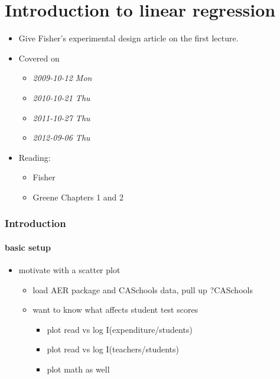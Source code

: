
\part*{Introduction to linear regression}%

\begin{itemize}
\item Give Fisher's experimental design article on the first lecture.
\item Covered on
\begin{itemize}
\item \textit{2009-10-12 Mon}
\item \textit{2010-10-21 Thu}
\item \textit{2011-10-27 Thu}
\item \textit{2012-09-06 Thu}
\end{itemize}
\item Reading:
\begin{itemize}
\item Fisher
\item Greene Chapters 1 and 2
\end{itemize}
\end{itemize}
\section{Introduction}
\label{sec-1}
\subsection{basic setup}
\label{sec-1-1}

\begin{itemize}
\item motivate with a scatter plot
\begin{itemize}
\item load AER package and CASchools data, pull up ?CASchools
\item want to know what affects student test scores
\begin{itemize}
\item plot read vs log I(expenditure/students)
\item plot read vs log I(teachers/students)
\item plot math as well
\end{itemize}
\end{itemize}
\end{itemize}
